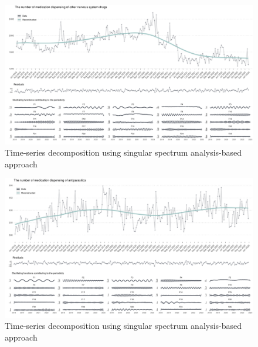 \documentclass[
  letterpaper,
  DIV=11,
  numbers=noendperiod]{scrartcl}
\begin{document}
\begin{figure}[H]

{\centering \includegraphics[width=1\linewidth,height=\textheight,keepaspectratio]{supplementary_files/figure-pdf/unnamed-chunk-2-19.pdf}

}

\caption{Time-series decomposition using singular spectrum
analysis-based approach}

\end{figure}%

\begin{figure}[H]

{\centering \includegraphics[width=1\linewidth,height=\textheight,keepaspectratio]{supplementary_files/figure-pdf/unnamed-chunk-2-20.pdf}

}

\caption{Time-series decomposition using singular spectrum
analysis-based approach}

\end{figure}%
\end{document}
